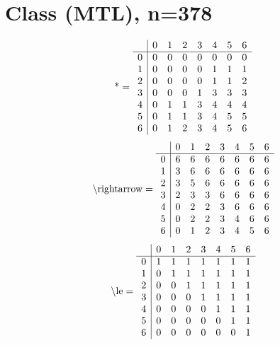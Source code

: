 \documentclass[11pt]{article}
\begin{document}
\section{Class (MTL), n=378}
\[\text{*} = 
\begin{array}{r | r r r r r r r}
 & 0 & 1 & 2 & 3 & 4 & 5 & 6 \\ \hline
0 & 0 & 0 & 0 & 0 & 0 & 0 & 0 \\
1 & 0 & 0 & 0 & 0 & 1 & 1 & 1 \\
2 & 0 & 0 & 0 & 0 & 1 & 1 & 2 \\
3 & 0 & 0 & 0 & 1 & 3 & 3 & 3 \\
4 & 0 & 1 & 1 & 3 & 4 & 4 & 4 \\
5 & 0 & 1 & 1 & 3 & 4 & 5 & 5 \\
6 & 0 & 1 & 2 & 3 & 4 & 5 & 6 \\
\end{array}
\]
\[\text{\textbackslash rightarrow} = 
\begin{array}{r | r r r r r r r}
 & 0 & 1 & 2 & 3 & 4 & 5 & 6 \\ \hline
0 & 6 & 6 & 6 & 6 & 6 & 6 & 6 \\
1 & 3 & 6 & 6 & 6 & 6 & 6 & 6 \\
2 & 3 & 5 & 6 & 6 & 6 & 6 & 6 \\
3 & 2 & 3 & 3 & 6 & 6 & 6 & 6 \\
4 & 0 & 2 & 2 & 3 & 6 & 6 & 6 \\
5 & 0 & 2 & 2 & 3 & 4 & 6 & 6 \\
6 & 0 & 1 & 2 & 3 & 4 & 5 & 6 \\
\end{array}
\]
\[\text{\textbackslash le} = 
\begin{array}{r | r r r r r r r}
 & 0 & 1 & 2 & 3 & 4 & 5 & 6 \\ \hline
0 & 1 & 1 & 1 & 1 & 1 & 1 & 1 \\
1 & 0 & 1 & 1 & 1 & 1 & 1 & 1 \\
2 & 0 & 0 & 1 & 1 & 1 & 1 & 1 \\
3 & 0 & 0 & 0 & 1 & 1 & 1 & 1 \\
4 & 0 & 0 & 0 & 0 & 1 & 1 & 1 \\
5 & 0 & 0 & 0 & 0 & 0 & 1 & 1 \\
6 & 0 & 0 & 0 & 0 & 0 & 0 & 1 \\
\end{array}
\]
\end{document}
